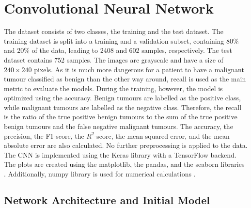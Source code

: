 \chapter{Convolutional Neural Network}
\label{cha:CNN}

The dataset consists of two classes, the training and the test dataset. 
The training dataset is split into a training and a validation subset, containing 80\% and 20\% of the data, leading to 2408 and 602 samples, respectively.
The test dataset contains 752 samples.
The images are grayscale and have a size of $240 \times 240$ pixels.
As it is much more dangerous for a patient to have a malignant tumour classified as benign than the other way around, recall is used as the main metric to evaluate the models.
During the training, however, the model is optimized using the accuracy.
Benign tumours are labelled as the positive class, while malignant tumours are labelled as the negative class.
Therefore, the recall is the ratio of the true positive benign tumours to the sum of the true positive benign tumours and the false negative malignant tumours.
The accuracy, the precision, the F1-score, the $R^2$-score, the mean squared error, and the mean absolute error are also calculated.
No further preprocessing is applied to the data.
The CNN is implemented using the Keras \cite{keras} library with a TensorFlow \cite{tensorflow} backend.
The plots are created using the matplotlib, the pandas, and the seaborn libraries \cite{matplotlib, pandas, seaborn}.
Additionally, numpy library is used for numerical calculations \cite{numpy}.

\section{Network Architecture and Initial Model}
\label{sec:initialModel}

